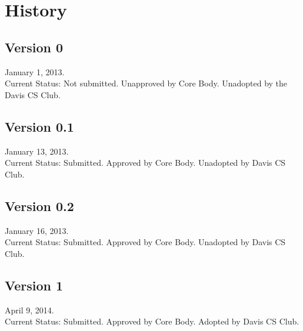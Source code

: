 \documentclass{article}
\begin{document}

\section{History}
\subsection*{Version 0}
January 1, 2013.\\
Current Status: Not submitted. Unapproved by Core Body. Unadopted by the Davis CS Club.
\subsection*{Version 0.1}
January 13, 2013.\\
Current Status: Submitted. Approved by Core Body. Unadopted by Davis CS Club.
\subsection*{Version 0.2}
January 16, 2013.\\
Current Status: Submitted. Approved by Core Body. Unadopted by Davis CS Club.
\subsection*{Version 1}
April 9, 2014.\\
Current Status: Submitted. Approved by Core Body. Adopted by Davis CS Club.
\end{document}
